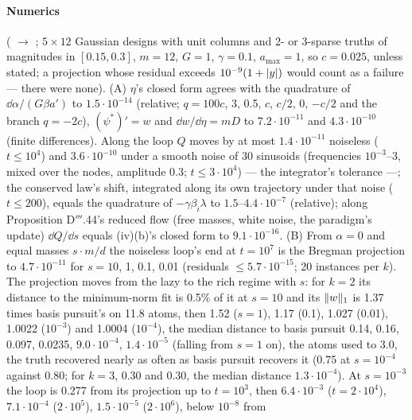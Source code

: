 \begin{sloppypar}
\paragraph{Numerics} ( $\to$ ; $5\times12$ Gaussian designs
with unit columns and 2- or 3-sparse truths of magnitudes in $[0.15,0.3]$, $m = 12$, $G = 1$, $\gamma = 0.1$,
$a_{\max} = 1$, so $c = 0.025$, unless stated; a projection whose residual exceeds $10^{-9}(1 + \lvert y\rvert)$ would count as a
failure --- there were none). (A) $\eta$'s closed form agrees with the quadrature of $\dd\alpha/(G\beta a')$ to
$1.5\cdot10^{-14}$ (relative; $q = 100c$, 3, 0.5, $c$, $c/2$, 0, $-c/2$ and the branch $q = -2c$), $(\psi^*)' = w$ and
$\dd w/\dd\eta = mD$ to $7.2\cdot10^{-11}$ and $4.3\cdot10^{-10}$ (finite differences). Along the loop $Q$ moves by at
most $1.4\cdot10^{-11}$ noiseless ($t\le10^4$) and $3.6\cdot10^{-10}$ under a smooth noise of 30 sinusoids (frequencies
$10^{-3}$--3, mixed over the nodes, amplitude 0.3; $t\le3\cdot10^4$) --- the integrator's tolerance ---; the conserved
law's shift, integrated along its own trajectory under that noise ($t\le200$), equals the quadrature of
$-\gamma\beta_i\lambda$ to $1.5$--$4.4\cdot10^{-7}$ (relative); along Proposition D$'''$.44's reduced flow (free
masses, white noise, the paradigm's update) $\dd Q/\dd s$ equals (iv)(b)'s closed form to $9.1\cdot10^{-16}$. (B) From
$\alpha = 0$ and equal masses $s\cdot m/d$ the noiseless loop's end at $t = 10^7$ is the Bregman projection to
$4.7\cdot10^{-11}$ for $s = 10$, 1, 0.1, 0.01 (residuals $\le5.7\cdot10^{-15}$; 20 instances per $k$). The projection
moves from the lazy to the rich regime with $s$: for $k = 2$ its distance to the minimum-norm fit is 0.5\% of it at
$s = 10$ and its $\lVert w\rVert_1$ is 1.37 times basis pursuit's on 11.8 atoms, then 1.52 ($s = 1$), 1.17 (0.1), 1.027
(0.01), 1.0022 ($10^{-3}$) and 1.0004 ($10^{-4}$), the median distance to basis pursuit 0.14, 0.16, 0.097, 0.0235,
$9.0\cdot10^{-4}$, $1.4\cdot10^{-5}$ (falling from $s = 1$ on), the atoms used to 3.0, the truth recovered nearly as
often as basis pursuit recovers it (0.75 at $s = 10^{-4}$ against 0.80; for $k = 3$, 0.30 and 0.30, the median distance
$1.3\cdot10^{-4}$). At $s = 10^{-3}$ the loop is 0.277 from its projection up to $t = 10^3$, then $6.4\cdot10^{-3}$
($t = 2\cdot10^4$), $7.1\cdot10^{-4}$ ($2\cdot10^5$), $1.5\cdot10^{-5}$ ($2\cdot10^6$), below $10^{-8}$ from

\end{sloppypar}

